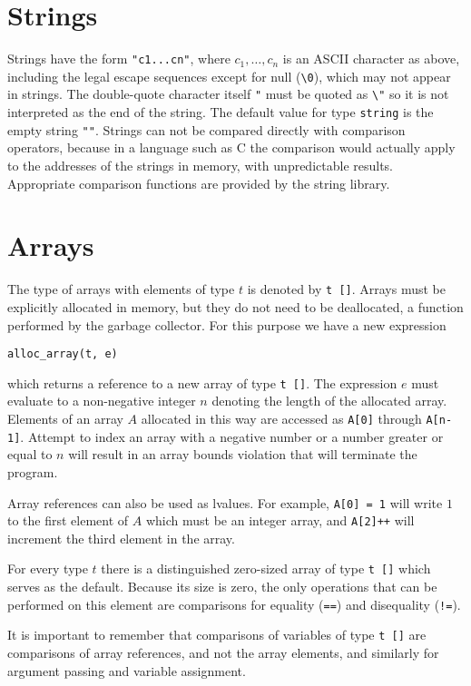 \documentclass[11pt]{article}
\begin{document}
\section{Strings}

Strings have the form \verb'"c1...cn"', where $c_1, \ldots, c_n$ is an
ASCII character as above, including the legal escape sequences except
for null (\verb'\0'), which may not appear in strings.  The
double-quote character itself \verb'"' must be quoted as \verb'\"' so
it is not interpreted as the end of the string.  The default value for
type \verb'string' is the empty string \verb'""'.  Strings can not be
compared directly with comparison operators, because in a language
such as C the comparison would actually apply to the addresses of the
strings in memory, with unpredictable results.  Appropriate comparison
functions are provided by the string library.

\section{Arrays}

The type of arrays with elements of type $t$ is denoted
by \verb't []'.  Arrays must be explicitly allocated in memory,
but they do not need to be deallocated, a function performed by
the garbage collector.  For this purpose we have a new expression
\begin{verbatim}
alloc_array(t, e)
\end{verbatim}
which returns a reference to a new array of type \verb't []'.  The
expression $e$ must evaluate to a non-negative integer $n$
denoting the length of the allocated array.  Elements
of an array $A$ allocated in this way are accessed as
\verb'A[0]' through \verb'A[n-1]'.  Attempt to index an array
with a negative number or a number greater or equal to $n$ will
result in an array bounds violation that will terminate the
program.

Array references can also be used as lvalues.  For
example, \verb'A[0] = 1' will write $1$ to the first element
of $A$ which must be an integer array, and \verb'A[2]++' will
increment the third element in the array.

For every type $t$ there is a distinguished zero-sized array of type
\verb't []' which serves as the default.  Because its size is zero,
the only operations that can be performed on this element are
comparisons for equality (\verb'==') and disequality (\verb'!=').

It is important to remember that comparisons of variables of
type \verb't []' are comparisons of array references, and not
the array elements, and similarly for argument passing and variable
assignment.
\end{document}

